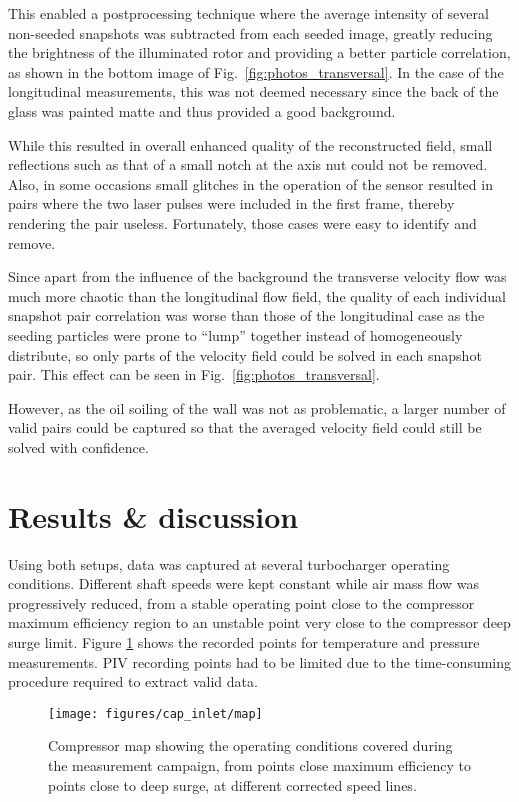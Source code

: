 This enabled a postprocessing technique where the average intensity of several non-seeded snapshots was subtracted from each seeded image, greatly reducing the brightness of the illuminated rotor and providing a better particle correlation, as shown in the bottom image of Fig.~\ref{fig:photos_transversal}. In the case of the longitudinal measurements, this was not deemed necessary since the back of the glass was painted matte and thus provided a good background.

While this resulted in overall enhanced quality of the reconstructed field, small reflections such as that of a small notch at the axis nut could not be removed. Also, in some occasions small glitches in the operation of the sensor resulted in pairs where the two laser pulses were included in the first frame, thereby rendering the pair useless. Fortunately, those cases were easy to identify and remove.

Since apart from the influence of the background the transverse velocity flow was much more chaotic than the longitudinal flow field, the quality of each individual snapshot pair correlation was worse than those of the longitudinal case as the seeding particles were prone to ``lump'' together instead of homogeneously distribute, so only parts of the velocity field could be solved in each snapshot pair. This effect can be seen in Fig.~\ref{fig:photos_transversal}.

However, as the oil soiling of the wall was not as problematic, a larger number of valid pairs could be captured so that the averaged velocity field could still be solved with confidence.

\section{Results \& discussion}

Using both setups, data was captured at several turbocharger operating conditions. Different shaft speeds were kept constant while air mass flow was progressively reduced, from a stable operating point close to the compressor maximum efficiency region to an unstable point very close to the compressor deep surge limit. Figure \ref{fig:map_straight} shows the recorded points for temperature and pressure measurements. PIV recording points had to be limited due to the time-consuming procedure required to extract valid data.

\begin{figure}[htb!]
\centering
\texttt{[image: figures/cap\_inlet/map]}
\caption[Compressor map with operating conditions]{Compressor map showing the operating conditions covered during the measurement campaign, from points close maximum efficiency to points close to deep surge, at different corrected speed lines.}
\label{fig:map_straight}
\end{figure}

